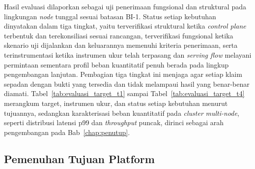 Hasil evaluasi dilaporkan sebagai uji penerimaan fungsional dan struktural pada lingkungan \textit{node} tunggal sesuai batasan BI-1. Status setiap kebutuhan dinyatakan dalam tiga tingkat, yaitu terverifikasi struktural ketika \textit{control plane} terbentuk dan terekonsiliasi sesuai rancangan, terverifikasi fungsional ketika skenario uji dijalankan dan keluarannya memenuhi kriteria penerimaan, serta terinstrumentasi ketika instrumen ukur telah terpasang dan \textit{serving flow} melayani permintaan sementara profil beban kuantitatif penuh berada pada lingkup pengembangan lanjutan. Pembagian tiga tingkat ini menjaga agar setiap klaim sepadan dengan bukti yang tersedia dan tidak melampaui hasil yang benar-benar diamati. Tabel~\ref{tab:evaluasi_target_t1} sampai Tabel~\ref{tab:evaluasi_target_t4} merangkum target, instrumen ukur, dan status setiap kebutuhan menurut tujuannya, sedangkan karakterisasi beban kuantitatif pada \textit{cluster} \textit{multi-node}, seperti distribusi latensi p99 dan \textit{throughput} puncak, dirinci sebagai arah pengembangan pada Bab~\ref{chap:penutup}.

\subsection{Pemenuhan Tujuan Platform}
\label{subsec:hasil-tujuan}










